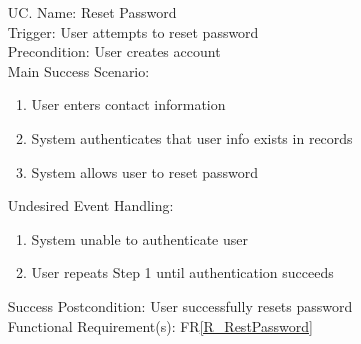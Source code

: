 \documentclass[12pt]{article}
\newcounter{ucnum} %
\begin{document}
\begin{itemize}
\item[UC\refstepcounter{ucnum}\theucnum \label{UC_ResetPassword}. ]
Name: Reset Password\\
Trigger: User attempts to reset password\\
Precondition: User creates account\\
Main Success Scenario:
\begin{enumerate}
    \item User enters contact information
    \item System authenticates that user info exists in records
    \item System allows user to reset password
\end{enumerate}
Undesired Event Handling:
\begin{enumerate}
    \item System unable to authenticate user
    \item User repeats Step 1 until authentication succeeds
\end{enumerate}
Success Postcondition: User successfully resets password\\
Functional Requirement(s): FR\ref{R_RestPassword}


\end{itemize}
\end{document}
